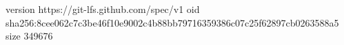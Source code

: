 version https://git-lfs.github.com/spec/v1
oid sha256:8cee062c7c3be46f10e9002c4b88bb79716359386c07c25f62897cb0263588a5
size 349676
